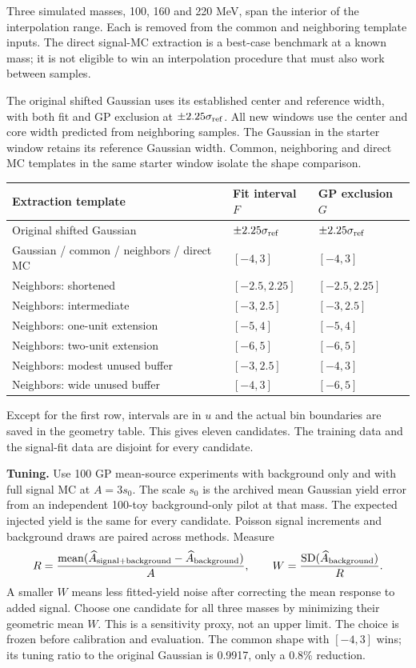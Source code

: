 \documentclass[11pt]{article}
\begin{document}
Three simulated masses, 100, 160 and 220 MeV, span the interior of the interpolation range. Each is removed from the common and neighboring template inputs. The direct signal-MC extraction is a best-case benchmark at a known mass; it is not eligible to win an interpolation procedure that must also work between samples.

The original shifted Gaussian uses its established center and reference width, with both fit and GP exclusion at $\pm2.25\sigma_{\rm ref}$. All new windows use the center and core width predicted from neighboring samples. The Gaussian in the starter window retains its reference Gaussian width. Common, neighboring and direct MC templates in the same starter window isolate the shape comparison.
\begin{center}\small\begin{tabular}{lll}\toprule
Extraction template & Fit interval $F$ & GP exclusion $G$\\\midrule
Original shifted Gaussian & $\pm2.25\sigma_{\rm ref}$ & $\pm2.25\sigma_{\rm ref}$\\
Gaussian / common / neighbors / direct MC & $[-4,3]$ & $[-4,3]$\\
Neighbors: shortened & $[-2.5,2.25]$ & $[-2.5,2.25]$\\
Neighbors: intermediate & $[-3,2.5]$ & $[-3,2.5]$\\
Neighbors: one-unit extension & $[-5,4]$ & $[-5,4]$\\
Neighbors: two-unit extension & $[-6,5]$ & $[-6,5]$\\
Neighbors: modest unused buffer & $[-3,2.5]$ & $[-4,3]$\\
Neighbors: wide unused buffer & $[-4,3]$ & $[-6,5]$\\
\bottomrule\end{tabular}\end{center}
Except for the first row, intervals are in $u$ and the actual bin boundaries are saved in the geometry table. This gives eleven candidates. The training data and the signal-fit data are disjoint for every candidate.

\textbf{Tuning.} Use 100 GP mean-source experiments with background only and with full signal MC at $A=3s_0$. The scale $s_0$ is the archived mean Gaussian yield error from an independent 100-toy background-only pilot at that mass. The expected injected yield is the same for every candidate. Poisson signal increments and background draws are paired across methods. Measure
\[
 R=\frac{\operatorname{mean}(\widehat A_{\rm signal+background}-\widehat A_{\rm background})}{A},
 \qquad W=\frac{\operatorname{SD}(\widehat A_{\rm background})}{R}.
\]
A smaller $W$ means less fitted-yield noise after correcting the mean response to added signal. Choose one candidate for all three masses by minimizing their geometric mean $W$. This is a sensitivity proxy, not an upper limit. The choice is frozen before calibration and evaluation. The common shape with $[-4,3]$ wins; its tuning ratio to the original Gaussian is 0.9917, only a 0.8\% reduction.
\end{document}
